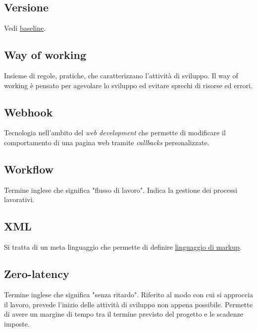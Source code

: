 	\subsection{Versione}
	\label{sec:versione}
	Vedi \underline{\hyperref[sec:baseline]{baseline}}.


	\newpage


	\subsection{Way of working}
	\label{sec:wow}
	Insieme di regole, pratiche, che caratterizzano l'attività di sviluppo. Il way of working è pensato per agevolare lo sviluppo ed evitare sprechi di risorse ed errori.


	\subsection{Webhook}
	\label{sec:webhook}
	Tecnologia nell'ambito del \emph{web development} che permette di modificare il comportamento di una pagina web tramite \emph{callbacks} personalizzate.


	\subsection{Workflow}
	\label{sec:workflow}
	Termine inglese che significa "flusso di lavoro". Indica la gestione dei processi lavorativi.


	\newpage


	\subsection{XML}
	\label{sec:xml}
	Si tratta di un meta linguaggio che permette di definire \underline{\hyperref[sec:linguaggiomarkup]{linguaggio di markup}}.


	\newpage


	\subsection{Zero-latency}
	\label{sec:zerolatency}
	Termine inglese che significa "senza ritardo". Riferito al modo con cui si approccia il lavoro, prevede l'inizio delle attività di sviluppo non appena possibile. Permette di avere un margine di tempo tra il termine previsto del progetto e le scadenze imposte.


